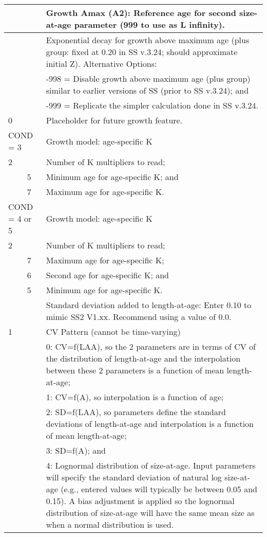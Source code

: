 \begin{longtable}{p{0.5cm} p{2cm} p{12cm}}
	\Tstrut 25 & & Growth Amax (A2): Reference age for second size-at-age parameter (999 to use as L infinity).\Bstrut\\
	\hline
	
	\Tstrut 0.20 & & Exponential decay for growth above maximum age (plus group: fixed at 0.20 in SS v.3.24; should approximate initial Z). Alternative Options: \\
			     & & -998 = Disable growth above maximum age (plus group) similar to earlier versions of SS (prior to SS v.3.24); and\\
			     & & -999 = Replicate the simpler calculation done in SS v.3.24.\Bstrut\\
	\hline
	
	0   & & Placeholder for future growth feature. \Tstrut\Bstrut\\
	\hline

	\multicolumn{2}{l}{COND = 3} & Growth model: age-specific K \Tstrut\\
	2 & & Number of K multipliers to read;\\
	& 5 & Minimum age for age-specific K; and\\
	& 7 & Maximum age for age-specific K.\Bstrut\\
	
	\multicolumn{2}{l}{COND = 4 or 5} & Growth model: age-specific K \Tstrut\\
	2 & & Number of K multipliers to read;\\
  	  & 7 & Maximum age for age-specific K;\\
	  & 6 & Second age for age-specific K; and\\
	  & 5 & Minimum age for age-specific K.\Bstrut\\
	\hline

	\Tstrut 0 & & Standard deviation added to length-at-age: Enter 0.10 to mimic SS2 V1.xx. Recommend using a value of 0.0.\Bstrut\\
	\hline

	1 & & CV Pattern (cannot be time-varying) \Tstrut\\
	  & & 0: CV=f(LAA), so the 2 parameters are in terms of CV of the distribution of length-at-age and the interpolation between these 2 parameters is a function of mean length-at-age;\\
	  & & 1: CV=f(A), so interpolation is a function of age;\\
	  & & 2: SD=f(LAA), so parameters define the standard deviations of length-at-age and interpolation is a function of mean length-at-age;\\
	  & & 3: SD=f(A); and \\
	  & & 4: Lognormal distribution of size-at-age.  Input parameters will specify the standard deviation of natural log size-at-age (e.g., entered values will typically be between 0.05 and 0.15). A bias adjustment is applied so the lognormal distribution of size-at-age will have the same mean size as when a normal distribution is used.\Bstrut\\
	\hline
\end{longtable}


